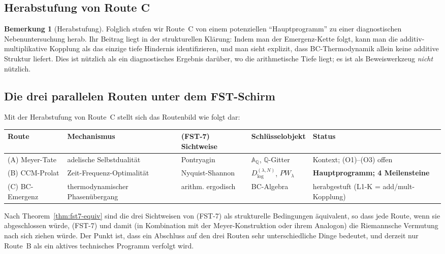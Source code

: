 \documentclass[11pt,a4paper]{article}
\theoremstyle{plain}
\theoremstyle{definition}
\newtheorem{remark}[theorem]{Bemerkung}
\newcommand{\Q}{\mathbb{Q}}
\newcommand{\A}{\mathbb{A}}
\begin{document}
\subsection{Herabstufung von Route C}

\begin{remark}[Herabstufung]
\label{rem:route-c-demotion}
Folglich stufen wir Route~C von einem potenziellen ``Hauptprogramm'' zu einer
diagnostischen Nebenuntersuchung herab. Ihr Beitrag liegt in der strukturellen Klärung:
Indem man der Emergenz-Kette folgt, kann man die additiv-multiplikative
Kopplung als das einzige tiefe Hindernis identifizieren, und man sieht explizit, dass
BC-Thermodynamik allein keine additive Struktur liefert. Dies ist nützlich als ein
diagnostisches Ergebnis darüber, wo die arithmetische Tiefe liegt; es ist
als Beweiswerkzeug \emph{nicht} nützlich.
\end{remark}

\subsection{Die drei parallelen Routen unter dem FST-Schirm}
\label{sec:three-routes}

Mit der Herabstufung von Route~C stellt sich das Routenbild wie folgt dar:

\begin{center}
\small
\begin{tabular}{@{}lllll@{}}
\toprule
\textbf{Route} & \textbf{Mechanismus} & \textbf{(FST-7) Sichtweise} &
\textbf{Schlüsselobjekt} & \textbf{Status} \\
\midrule
(A) Meyer-Tate      & adelische Selbstdualität & Pontryagin        &
$\A_\Q$, $\Q$-Gitter & Kontext; (O1)--(O3) offen \\
(B) CCM-Prolat      & Zeit-Frequenz-Optimalität & Nyquist-Shannon &
$D^{(\lambda,N)}_{\log}$, $PW_\lambda$ & \textbf{Hauptprogramm; 4 Meilensteine} \\
(C) BC-Emergenz     & thermodynamischer Phasenübergang & arithm. ergodisch &
BC-Algebra            & herabgestuft (L1-K = add/mult-Kopplung) \\
\bottomrule
\end{tabular}
\end{center}

Nach Theorem~\ref{thm:fst7-equiv} sind die drei Sichtweisen von (FST-7)
als strukturelle Bedingungen äquivalent, so dass jede Route, wenn sie abgeschlossen
würde, (FST-7) und damit (in Kombination mit der Meyer-Konstruktion
oder ihrem Analogon) die Riemannsche Vermutung nach sich ziehen würde.
Der Punkt ist, dass ein Abschluss auf den drei Routen sehr unterschiedliche Dinge bedeutet, und
derzeit nur Route~B als ein aktives technisches Programm verfolgt wird.
\end{document}
